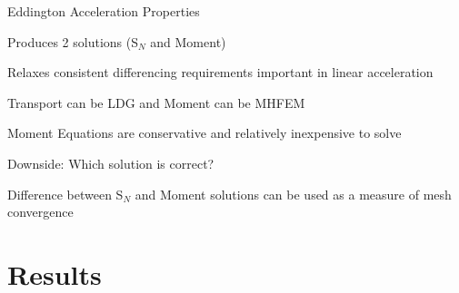 \documentclass[10pt,draft]{beamer}
\newcommand{\SN}{S$_N$\xspace}
\begin{document}
\begin{frame}{Eddington Acceleration Properties}

	Produces 2 solutions (\SN and Moment)

	\pause
	Relaxes consistent differencing requirements important in linear acceleration 

	\pause 
	Transport can be LDG and Moment can be MHFEM 

	\pause 
	Moment Equations are conservative and relatively inexpensive to solve 

	\pause
	Downside: Which solution is correct? 

	\pause 
	Difference between \SN and Moment solutions can be used as a measure of mesh convergence 

\end{frame}

\section{Results}















\end{document}
